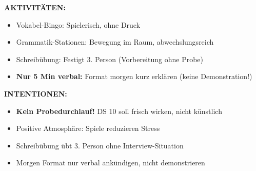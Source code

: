 \documentclass[11pt, a4paper]{article}
\begin{document}
\begin{dsbox}[title={DS 9 -- Repaso: Vocabulario y Gramática (Mo, 02.02.2026)}]
\vspace{0.2cm}

\textbf{AKTIVITÄTEN:}
\begin{itemize}[leftmargin=1.5em, nosep]
    \item Vokabel-Bingo: Spielerisch, ohne Druck
    \item Grammatik-Stationen: Bewegung im Raum, abwechslungsreich
    \item Schreibübung: Festigt 3. Person (Vorbereitung ohne Probe)
    \item \textbf{Nur 5 Min verbal:} Format morgen kurz erklären (keine Demonstration!)
\end{itemize}

\vspace{0.2cm}

\textbf{INTENTIONEN:}
\begin{itemize}[leftmargin=1.5em, nosep]
    \item \textbf{Kein Probedurchlauf!} DS 10 soll frisch wirken, nicht künstlich
    \item Positive Atmosphäre: Spiele reduzieren Stress
    \item Schreibübung übt 3. Person ohne Interview-Situation
    \item Morgen \glqq{}Format\grqq{} nur verbal ankündigen, nicht demonstrieren
\end{itemize}

\end{dsbox}

\vspace{0.5cm}
\end{document}
